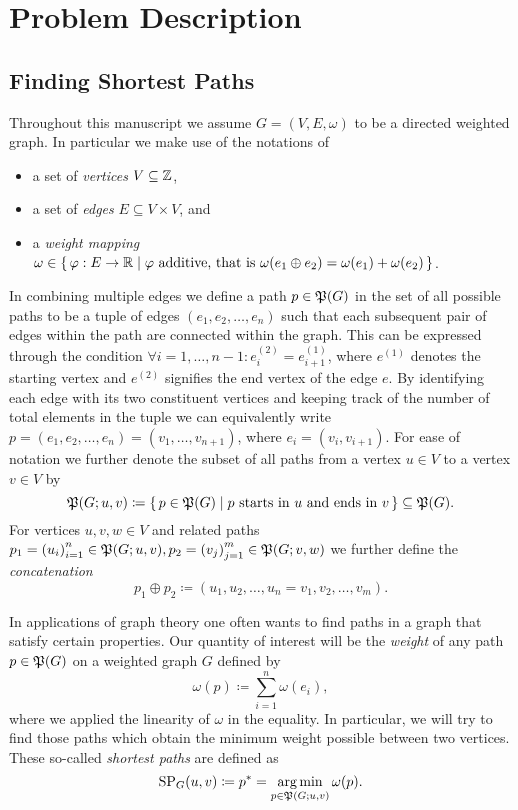 \chapter{Problem Description}\label{chap:problem-setting}

\section{Finding Shortest Paths}

Throughout this manuscript we assume $G = (V, E, \omega)$ to be a directed weighted graph.
In particular we make use of the notations of
\begin{itemize}
    \item a set of \emph{vertices} $V \subseteq \mathbb{Z}$,
    \item a set of \emph{edges} $E \subseteq V \times V$, and
    \item a \emph{weight mapping} $\omega \in \left\{\,\varphi: E \rightarrow \mathbb{R}\mid\text{$\varphi$ additive, that is $\omega(e_1 \oplus e_2) = \omega(e_1) + \omega(e_2)$}\,\right\}$.
\end{itemize}
In combining multiple edges we define a path $p \in \mathfrak{P}(G)$ in the set of all possible paths to be a tuple of edges $(e_1, e_2, \dots, e_n)$ such that each subsequent pair of edges within the path are connected within the graph.
This can be expressed through the condition $\forall i = 1, \dots, n - 1: e_i^{(2)} = e_{i + 1}^{(1)}$, where $e^{(1)}$ denotes the starting vertex and $e^{(2)}$ signifies the end vertex of the edge $e$.
By identifying each edge with its two constituent vertices and keeping track of the number of total elements in the tuple we can equivalently write $p = (e_1, e_2, \dots, e_n) = (v_1, \dots, v_{n + 1})$, where $e_i = (v_i, v_{i + 1})$.
For ease of notation we further denote the subset of all paths from a vertex $u \in V$ to a vertex $v \in V$ by
\[
    \mathfrak{P}(G; u, v) \coloneqq \left\{\,p \in \mathfrak{P}(G)\mid\text{$p$ starts in $u$ and ends in $v$}\,\right\} \subseteq \mathfrak{P}(G).
\]
For vertices $u, v, w \in V$ and related paths $p_1 = {(u_i)}_{i = 1}^n \in \mathfrak{P}(G; u, v), p_2 = {(v_j)}_{j = 1}^m \in \mathfrak{P}(G; v, w)$ we further define the \emph{concatenation}
\[
    p_1 \oplus p_2 \coloneqq (u_1, u_2, \dots, u_n = v_1, v_2, \dots, v_m).
\]

In applications of graph theory one often wants to find paths in a graph that satisfy certain properties.
Our quantity of interest will be the \emph{weight} of any path $p \in \mathfrak{P}(G)$ on a weighted graph $G$ defined by
\[
    \omega(p) \coloneqq \sum\limits_{i = 1}^n \omega(e_i),
\]
where we applied the linearity of $\omega$ in the equality.
In particular, we will try to find those paths which obtain the minimum weight possible between two vertices.
These so-called \emph{shortest paths} are defined as
\[
    \operatorname{SP}_G(u, v) \coloneqq p^* = \operatorname*{arg\,min}\limits_{p \in \mathfrak{P}(G; u, v)} \omega(p).
\]


